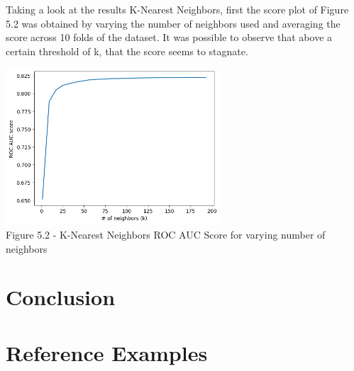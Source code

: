 \documentclass{IEEEtran}
\begin{document}
Taking a look at the results K-Nearest Neighbors, first the score plot of Figure 5.2 was obtained by varying the number of neighbors used and averaging the score across 10 folds of the dataset. It was possible to observe that above a certain threshold of k, that the score seems to stagnate.
\begin{center}
    \includegraphics[width=8cm]{figures/KNN_score.png}\\
    Figure 5.2 - K-Nearest Neighbors ROC AUC Score for varying number of neighbors
\end{center}



\section{Conclusion}

\vfill
\pagebreak

\section{Reference Examples}
\end{document}

